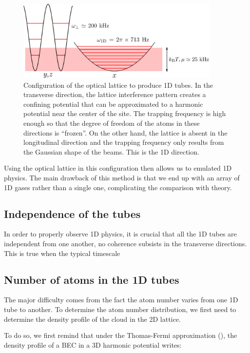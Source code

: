 \begin{figure}
    \centering
    \includegraphics[width=0.9\textwidth]{Fig/Chapter5/1D_config.png}
    \caption{Configuration of the optical lattice to produce 1D tubes. In the transverse direction, the lattice interference pattern creates a confining potential that can be approximated to a harmonic potential near the center of the site. The trapping frequency is high enough so that the degree of freedom of the atoms in these directions is ``frozen''. On the other hand, the lattice is absent in the longitudinal direction and the trapping frequency only results from the Gaussian shape of the beams. This is the 1D direction.}
    \label{fig:my_label}
\end{figure}


Using the optical lattice in this configuration then allows us to emulated 1D physics. The main drawback of this method is that we end up with an array of 1D gases rather than a single one, complicating the comparison with theory.

\subsection{Independence of the tubes}

In order to properly observe 1D physics, it is crucial that all the 1D tubes are independent from one another, \ie no coherence subsists in the transverse directions. This is true when the typical timescale 

\subsection{Number of atoms in the 1D tubes}

The major difficulty comes from the fact the atom number varies from one 1D tube to another. To determine the atom number distribution, we first need to determine the density profile of the cloud in the 2D lattice.

To do so, we first remind that under the Thomas-Fermi approximation (), the density profile of a BEC in a 3D harmonic potential writes:

